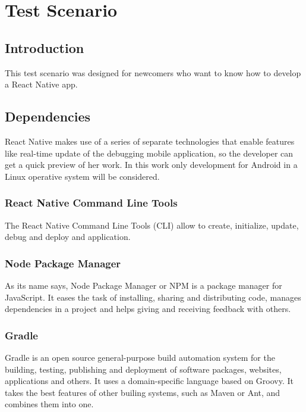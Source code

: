 \chapter{Test Scenario}
\justifying
\section{Introduction}

This test scenario was designed for newcomers who want to know how to develop a React Native app.

\section{Dependencies}

React Native makes use of a series of separate technologies that enable features like real-time update of the debugging mobile application, so the developer can get a quick preview of her work. In this work only development for Android in a Linux operative system will be considered.

\subsection{React Native Command Line Tools}

The React Native Command Line Tools (CLI) allow to create, initialize, update, debug and deploy and application.

\subsection{Node Package Manager}

As its name says, Node Package Manager or NPM is a package manager for JavaScript. It eases the task of installing, sharing and distributing code, manages dependencies in a project and helps giving and receiving feedback with others.

\subsection{Gradle}

Gradle is an open source general-purpose build automation system for the building, testing, publishing and deployment of software packages, websites, applications and others. It uses a domain-specific language based on Groovy. It takes the best features of other builing systems, such as Maven or Ant, and combines them into one.


